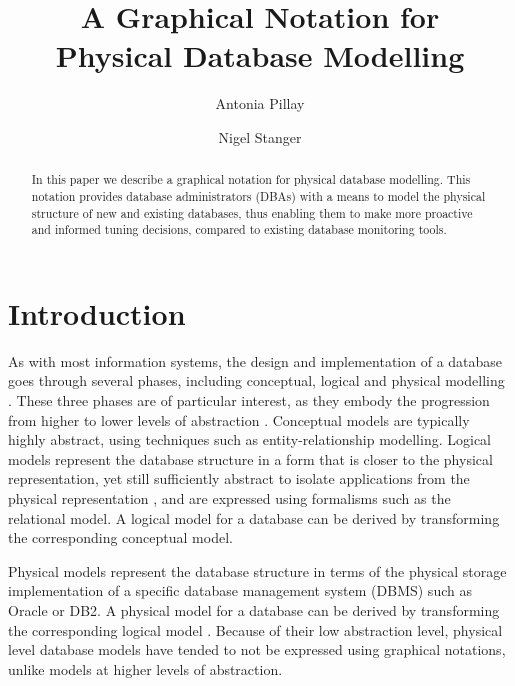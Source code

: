 \documentclass{llncs}
\title{A Graphical Notation for \\ Physical Database Modelling}
\author{Antonia Pillay\inst{1} \and Nigel Stanger\inst{2}}
\institute{???? Malaysia \and Department of Information Science, University of Otago, Dunedin, New Zealand \email{nstanger@infoscience.otago.ac.nz}}
\begin{document}
\maketitle


\begin{abstract}
In this paper we describe a graphical notation for physical database
modelling. This notation provides database administrators (DBAs) with a
means to model the physical structure of new and existing databases,
thus enabling them to make more proactive and informed tuning decisions,
compared to existing database monitoring tools.
\end{abstract}


\section{Introduction}

As with most information systems, the design and implementation of a
database goes through several phases, including conceptual, logical and
physical modelling \cite{BeDa-P-2003}. These three phases are of
particular interest, as they embody the progression from higher to lower
levels of abstraction \cite{Tsic-D-1978}. Conceptual models are
typically highly abstract, using techniques such as entity-relationship
modelling. Logical models represent the database structure in a form
that is closer to the physical representation, yet still sufficiently
abstract to isolate applications from the physical representation
\cite{Codd-EF-1970}, and are expressed using formalisms such as the
relational model. A logical model for a database can be derived by
transforming the corresponding conceptual model.

Physical models represent the database structure in terms of the
physical storage implementation of a specific database management system
(DBMS) such as Oracle or DB2. A physical model for a database can be
derived by transforming the corresponding logical model
\cite{Bato-DS-1985,Conn-TM-2002}. Because of their low abstraction
level, physical level database models have tended to not be expressed
using graphical notations, unlike models at higher levels of
abstraction.
\end{document}
